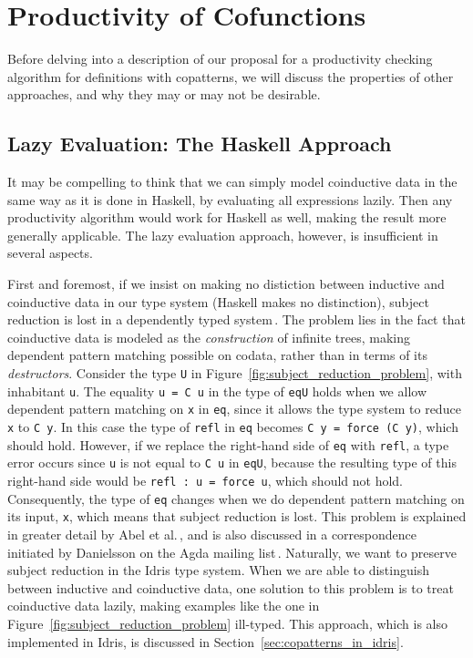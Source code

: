 \section{Productivity of Cofunctions}
\label{sec:productivity}

Before delving into a description of our proposal for a productivity checking algorithm for definitions with copatterns, we will discuss the properties of other approaches, and why they may or may not be desirable.

\subsection{Lazy Evaluation: The Haskell Approach}
It may be compelling to think that we can simply model coinductive data in the same way as it is done in Haskell, by evaluating all expressions lazily. Then any productivity algorithm would work for Haskell as well, making the result more generally applicable. The lazy evaluation approach, however, is insufficient in several aspects.

First and foremost, if we insist on making no distiction between inductive and coinductive data in our type system (Haskell makes no distinction), subject reduction is lost in a dependently typed system\,\citep{Abel13Copatterns}. The problem lies in the fact that coinductive data is modeled as the \emph{construction} of infinite trees, making dependent pattern matching possible on codata, rather than in terms of its \emph{destructors}. Consider the type \texttt{U} in Figure~\ref{fig:subject_reduction_problem}, with inhabitant \texttt{u}. The equality \texttt{u = C u} in the type of \texttt{eqU} holds when we allow dependent pattern matching on \texttt{x} in \texttt{eq}, since it allows the type system to reduce \texttt{x} to \texttt{C y}. In this case the type of \texttt{refl} in \texttt{eq} becomes \texttt{C y = force (C y)}, which should hold. However, if we replace the right-hand side of \texttt{eq} with \texttt{refl}, a type error occurs since \texttt{u} is not equal to \texttt{C u} in \texttt{eqU}, because the resulting type of this right-hand side would be \texttt{refl : u = force u}, which should not hold. Consequently, the type of \texttt{eq} changes when we do dependent pattern matching on its input, \texttt{x}, which means that subject reduction is lost. This problem is explained in greater detail by Abel et al.\,\citep{Abel13Copatterns}, and is also discussed in a correspondence initiated by Danielsson on the Agda mailing list\,\citep{OuryCounterexample}. Naturally, we want to preserve subject reduction in the Idris type system. When we are able to distinguish between inductive and coinductive data, one solution to this problem is to treat coinductive data lazily, making examples like the one in Figure~\ref{fig:subject_reduction_problem} ill-typed. This approach, which is also implemented in Idris, is discussed in Section~\ref{sec:copatterns_in_idris}.


